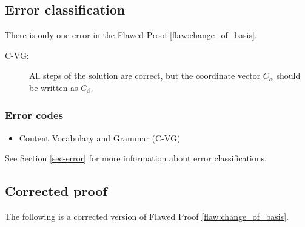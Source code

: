 \clearpage
\subsection{Error classification}


There %
is only one error %
 in the Flawed Proof \ref{flaw:change_of_basis}. %


 \begin{description}
 	\item[C-VG:] All steps of the solution are correct, but the coordinate vector $C_\alpha$ should be written as $C_\beta$.
 \end{description}


\subsubsection{Error codes}
\begin{itemize}
	\item 	Content Vocabulary and Grammar (C-VG)
\end{itemize}
See Section \ref{sec-error} for more information about error classifications.

\clearpage
\subsection{Corrected proof}

The following is a corrected version of Flawed Proof \ref{flaw:change_of_basis}. %

